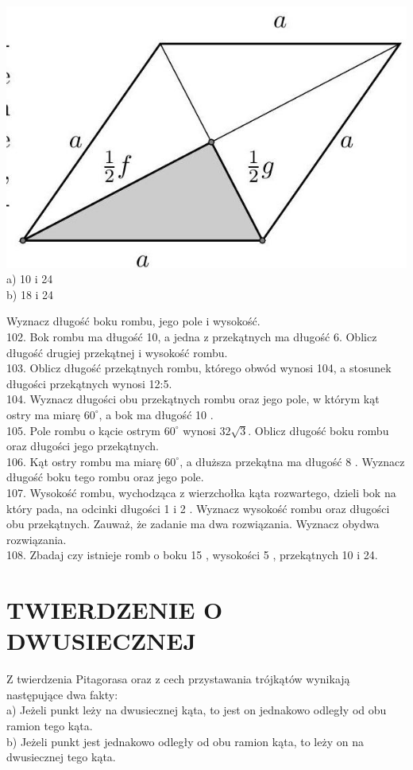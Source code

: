 \documentclass[10pt]{article}
\begin{document}
\includegraphics[max width=\textwidth, center]{2024_11_21_71f62bd117d375398909g-140}\\
a) 10 i 24\\
b) 18 i 24

Wyznacz długość boku rombu, jego pole i wysokość.\\
102. Bok rombu ma długość 10, a jedna z przekątnych ma długość 6. Oblicz długość drugiej przekątnej i wysokość rombu.\\
103. Oblicz długość przekątnych rombu, którego obwód wynosi 104, a stosunek długości przekątnych wynosi 12:5.\\
104. Wyznacz długości obu przekątnych rombu oraz jego pole, w którym kąt ostry ma miarę \(60^{\circ}\), a bok ma długość 10 .\\
105. Pole rombu o kącie ostrym \(60^{\circ}\) wynosi \(32 \sqrt{3}\). Oblicz długość boku rombu oraz długości jego przekątnych.\\
106. Kąt ostry rombu ma miarę \(60^{\circ}\), a dłuższa przekątna ma długość 8 . Wyznacz długość boku tego rombu oraz jego pole.\\
107. Wysokość rombu, wychodząca z wierzchołka kąta rozwartego, dzieli bok na który pada, na odcinki długości 1 i 2 . Wyznacz wysokość rombu oraz długości obu przekątnych. Zauważ, że zadanie ma dwa rozwiązania. Wyznacz obydwa rozwiązania.\\
108. Zbadaj czy istnieje romb o boku 15 , wysokości 5 , przekątnych 10 i 24.

\section*{TWIERDZENIE O DWUSIECZNEJ}
Z twierdzenia Pitagorasa oraz z cech przystawania trójkątów wynikają następujące dwa fakty:\\
a) Jeżeli punkt leży na dwusiecznej kąta, to jest on jednakowo odległy od obu ramion tego kąta.\\
b) Jeżeli punkt jest jednakowo odległy od obu ramion kąta, to leży on na dwusiecznej tego kąta.
\end{document}
